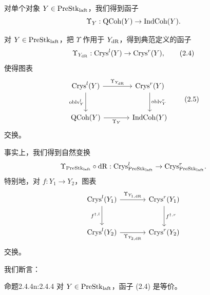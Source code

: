 对单个对象 $Y\in\mathrm{PreStk}_{\mathrm{laft}}$，我们得到函子
\[
\Upsilon_Y:\mathrm{QCoh}(Y)\to\mathrm{IndCoh}(Y).
\]

对 $Y\in\mathrm{PreStk}_{\mathrm{laft}}$，把 $\Upsilon$ 作用于 $Y_{\mathrm{dR}}$，得到典范定义的函子
\begin{equation}
\Upsilon_{Y_{\mathrm{dR}}}:\mathrm{Crys}^l(Y)\to\mathrm{Crys}^r(Y),\tag{2.4}
\end{equation}
使得图表
\begin{equation}
\begin{tikzcd}[column sep=large, row sep=large]
 \Crys^l(Y) \arrow[r, "\Upsilon_{Y_{\dR}}"] \arrow[d, "\oblv^l_Y"'] & \Crys^r(Y) \arrow[d, "\oblv^r_Y"] \\
 \QCoh(Y) \arrow[r, "\Upsilon_Y"'] & \IndCoh(Y)
\end{tikzcd}\tag{2.5}
\end{equation}
交换。

事实上，我们得到自然变换
\[
\Upsilon_{\mathrm{PreStk}_{\mathrm{laft}}}\circ\mathrm{dR}:\mathrm{Crys}^l_{\mathrm{PreStk}_{\mathrm{laft}}}\to\mathrm{Crys}^r_{\mathrm{PreStk}_{\mathrm{laft}}}.
\]
特别地，对 $f:Y_1\to Y_2$，图表
\[
\begin{tikzcd}[column sep=large, row sep=large]
 \Crys^l(Y_1) \arrow[r, "\Upsilon_{Y_{1,\dR}}"] \arrow[d, "f^{\dagger,l}"'] & \Crys^r(Y_1) \arrow[d, "f^{\dagger,r}"] \\
 \Crys^l(Y_2) \arrow[r, "\Upsilon_{Y_{2,\dR}}"'] & \Crys^r(Y_2)
\end{tikzcd}
\]
交换。

我们断言：

\begin{othm}{命题}{2.4.4}{n:2.4.4}
对 $Y\in\mathrm{PreStk}_{\mathrm{laft}}$，函子 (2.4) 是等价。
\end{othm}

